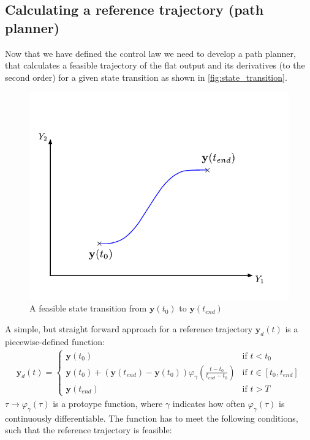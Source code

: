 \documentclass[a4paper,11pt,headings=standardclasses,parskip=half]{scrartcl}
\begin{document}
\subsection{Calculating a reference trajectory (path planner)}
Now that we have defined the control law we need to develop a path planner, that calculates a feasible trajectory of the flat output and its derivatives (to the second order) for a given state transition as shown in \autoref{fig:state_transition}.
\begin{figure}[ht]
	\centering
	\includegraphics[scale=1]{img/state_transition.pdf}
	\caption{A feasible state transition from $\mathbf{y}(t_0)$ to $\mathbf{y}(t_{end})$}
	\label{fig:state_transition}
\end{figure}
A simple, but straight forward approach for a reference trajectory $\mathbf{y}_d(t)$ is a piecewise-defined function:
\begin{align}
\label{eq:14}
\mathbf{y}_d(t) = \begin{cases} \mathbf{y}(t_0) &\textrm{if } t<t_0 \\ \mathbf{y}(t_0) + (\mathbf{y}(t_{end})-\mathbf{y}(t_0))\varphi_\gamma\left(\frac{t-t_0}{t_{end}-t_0}\right) &\textrm{if } t \in [t_0, t_{end}] \\ \mathbf{y}(t_{end}) &\textrm{if } t>T\end{cases}
\end{align}
$\tau \rightarrow \varphi_\gamma(\tau)$ is a protoype function, where $\gamma$ indicates how often $\varphi_\gamma(\tau)$ is continuously differentiable. The function has to meet the following conditions, such that the reference trajectory is feasible:
\end{document}
